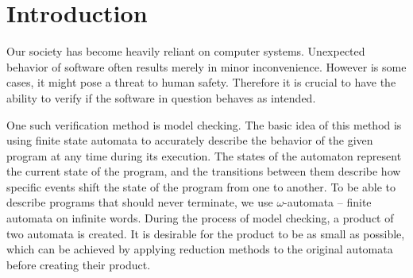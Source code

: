 \documentclass[
  digital, %
  twoside, %
  table,   %
  lof,     %
  lot,     %
]{fithesis3}
\begin{document}

\newcommand{\accmarkblue}{\begin{tikzpicture} \node[accset, collacc0] {}; \end{tikzpicture}}
\newcommand{\accmarkmag}{\begin{tikzpicture} \node[accset, collacc1] {}; \end{tikzpicture}}
\newcommand{\accmarkor}{\begin{tikzpicture} \node[accset, collacc2] {}; \end{tikzpicture}}
\newcommand{\accmarkred}{\begin{tikzpicture} \node[accset, collacc5] {}; \end{tikzpicture}}
\newcommand{\accmarkyell}{\begin{tikzpicture} \node[accset, collacc6] {}; \end{tikzpicture}}
\newcommand{\accmarkgr}{\begin{tikzpicture} \node[accset, collacc3] {}; \end{tikzpicture}}
\newcommand{\accmarkpink}{\begin{tikzpicture} \node[accset, collacc4] {}; \end{tikzpicture}}
\newcommand{\accsquaregr}{\begin{tikzpicture} \node[accsquare, collacc3] {}; \end{tikzpicture}}
\newcommand{\accsquareblue}{\begin{tikzpicture} \node[accsquare, collacc0] {}; \end{tikzpicture}}
\newcommand{\accsquaremag}{\begin{tikzpicture} \node[accsquare, collacc1] {}; \end{tikzpicture}}

\chapter{Introduction}
Our society has become heavily reliant on computer systems. Unexpected behavior of software often results merely in minor inconvenience. However is some cases, it might pose a threat to human safety. Therefore it is crucial to have the ability to verify if the software in question behaves as intended. 

One such verification method is model checking. The basic idea of this method is using finite state automata to accurately describe the behavior of the given program at any time during its execution. The states of the automaton represent the current state of the program, and the transitions between them describe how specific events shift the state of the program from one to another. To be able to describe programs that should never terminate, we use $\omega$-automata -- finite automata on infinite words. During the process of model checking, a product of two automata is created. It is desirable for the product to be as small as possible, which can be achieved by applying reduction methods to the original automata before creating their product.
\end{document}
